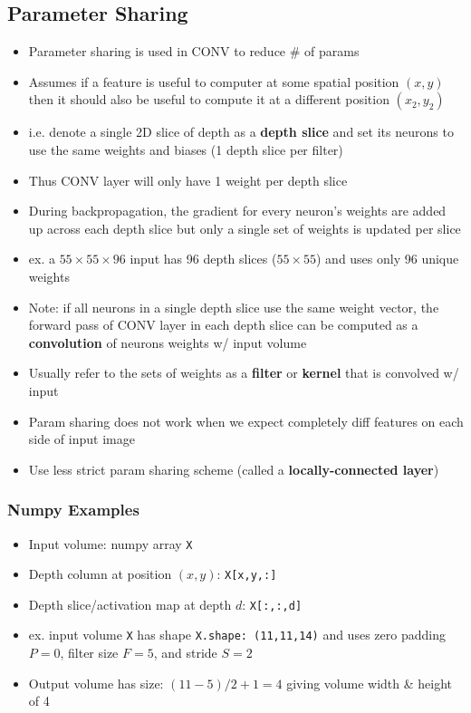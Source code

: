 \documentclass[a4paper,12pt]{article}
\begin{document}
\subsection{Parameter Sharing}
\begin{itemize}
  \item Parameter sharing is used in CONV to reduce \# of params
  \item Assumes if a feature is useful to computer at some spatial position $(x,y)$ then it should also be useful to compute it at a different position $(x_2, y_2)$
  \item i.e. denote a single 2D slice of depth as a \textbf{depth slice} and set its neurons to use the same weights and biases (1 depth slice per filter)
  \item Thus CONV layer will only have 1 weight per depth slice
  \item During backpropagation, the gradient for every neuron's weights are added up across each depth slice but only a single set of weights is updated per slice
  \item ex. a $55\times 55\times 96$ input has 96 depth slices ($55\times 55$) and uses only 96 unique weights
  \item Note: if all neurons in a single depth slice use the same weight vector, the forward pass of CONV layer in each depth slice can be computed as a \textbf{convolution} of neurons weights w/ input volume
  \item Usually refer to the sets of weights as a \textbf{filter} or \textbf{kernel} that is convolved w/ input
\end{itemize}
\begin{itemize}
  \item Param sharing does not work when we expect completely diff features on each side of input image
  \item Use less strict param sharing scheme (called  a \textbf{locally-connected layer})
\end{itemize}

\subsubsection{Numpy Examples}
\begin{itemize}
  \item Input volume: numpy array \lstinline{X}
  \item Depth column at position $(x,y)$: \lstinline{X[x,y,:]}
  \item Depth slice/activation map at depth $d$: \lstinline{X[:,:,d]}
\end{itemize}
\begin{itemize}
  \item ex. input volume \lstinline{X} has shape \lstinline{X.shape: (11,11,14)} and uses zero padding $P=0$, filter size $F=5$, and stride $S=2$
  \item Output volume has size: $(11-5)/2 + 1 = 4$ giving volume width \& height of 4
\end{itemize}
\end{document}
